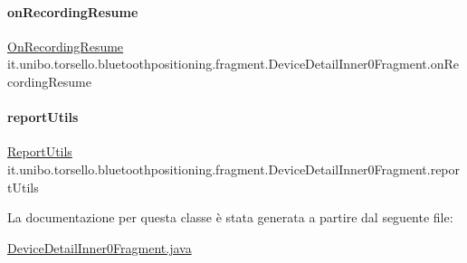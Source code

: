 \hypertarget{classit_1_1unibo_1_1torsello_1_1bluetoothpositioning_1_1fragment_1_1DeviceDetailInner0Fragment_a8603d0fe3501a6267a8cf9f9f0d29360_a8603d0fe3501a6267a8cf9f9f0d29360}{}\label{classit_1_1unibo_1_1torsello_1_1bluetoothpositioning_1_1fragment_1_1DeviceDetailInner0Fragment_a8603d0fe3501a6267a8cf9f9f0d29360_a8603d0fe3501a6267a8cf9f9f0d29360} 
\paragraph{\texorpdfstring{on\+Recording\+Resume}{onRecordingResume}}
{\footnotesize\ttfamily \hyperlink{interfaceit_1_1unibo_1_1torsello_1_1bluetoothpositioning_1_1fragment_1_1DeviceDetailInner0Fragment_1_1OnRecordingResume}{On\+Recording\+Resume} it.\+unibo.\+torsello.\+bluetoothpositioning.\+fragment.\+Device\+Detail\+Inner0\+Fragment.\+on\+Recording\+Resume\hspace{0.3cm}{\ttfamily [private]}}

\hypertarget{classit_1_1unibo_1_1torsello_1_1bluetoothpositioning_1_1fragment_1_1DeviceDetailInner0Fragment_aaca0aaeea8b6532c9e2683d415adfc59_aaca0aaeea8b6532c9e2683d415adfc59}{}\label{classit_1_1unibo_1_1torsello_1_1bluetoothpositioning_1_1fragment_1_1DeviceDetailInner0Fragment_aaca0aaeea8b6532c9e2683d415adfc59_aaca0aaeea8b6532c9e2683d415adfc59} 
\paragraph{\texorpdfstring{report\+Utils}{reportUtils}}
{\footnotesize\ttfamily \hyperlink{classit_1_1unibo_1_1torsello_1_1bluetoothpositioning_1_1util_1_1ReportUtils}{Report\+Utils} it.\+unibo.\+torsello.\+bluetoothpositioning.\+fragment.\+Device\+Detail\+Inner0\+Fragment.\+report\+Utils\hspace{0.3cm}{\ttfamily [private]}}



La documentazione per questa classe è stata generata a partire dal seguente file\+:\begin{DoxyCompactItemize}
\item 
\hyperlink{DeviceDetailInner0Fragment_8java}{Device\+Detail\+Inner0\+Fragment.\+java}\end{DoxyCompactItemize}

